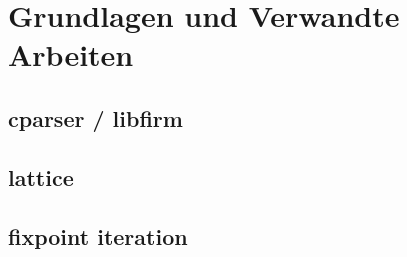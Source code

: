 \chapter{Grundlagen und Verwandte Arbeiten}\label{sec:basics}

\section{cparser / libfirm}
\section{lattice}
\section{fixpoint iteration}
